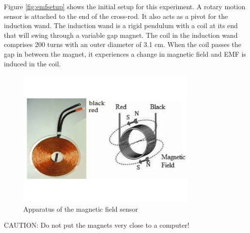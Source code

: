 Figure \ref{fig:emfsetup} shows the initial setup for this experiment. A rotary motion sensor is attached to the end of the cross-rod. It also acts as a pivot for the induction wand. The induction wand is a rigid pendulum with a coil at its end that will swing through a variable gap magnet. The coil in the induction wand comprises 200 turns with an outer diameter of 3.1 cm. When the coil passes the gap in between the magnet, it experiences a change in magnetic field and EMF is induced in the coil.\myskip

\begin{figure}[h]
\centering
\includegraphics[width=0.8\textwidth]{./Exp4/pic/emf_coil.png}
\caption{Apparatus of the magnetic field sensor}
\label{fig:emfcoil}
\end{figure}

CAUTION: Do not put the magnets very close to a computer! \myskip

